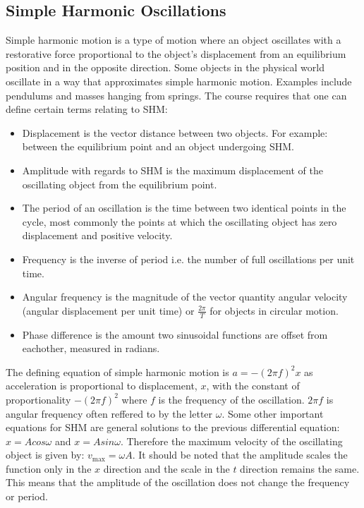 \documentclass[a4,8pt]{article}
\begin{document}
\subsection{Simple Harmonic Oscillations}
Simple harmonic motion is a type of motion where an object oscillates with a restorative force 
proportional to the object's displacement from an equilibrium position and in the opposite 
direction. Some objects in the physical world oscillate in a way that approximates simple 
harmonic motion. Examples include pendulums and masses hanging from springs. The course 
requires that one can define certain terms relating to SHM:
\begin{itemize}
	\item Displacement is the vector distance between two objects. For example: between the 
    equilibrium point and an object undergoing SHM.
	\item Amplitude with regards to SHM is the maximum displacement of the oscillating object 
    from the equilibrium point.
	\item The period of an oscillation is the time between two identical points in the cycle, 
    most commonly the points at which the oscillating object has zero displacement and positive
    velocity.
	\item Frequency is the inverse of period i.e. the number of full oscillations per unit 
    time.
	\item Angular frequency is the magnitude of the vector quantity angular velocity (angular 
    displacement per unit time) or $\frac{2\pi}{T}$ for objects in circular motion.
	\item Phase difference is the amount two sinusoidal functions are offset from eachother, 
    measured in radians.
\end{itemize}

The defining equation of simple harmonic motion is $a=-(2\pi f)^2 x$ as acceleration is 
proportional to displacement, $x$, with the constant of proportionality $-(2\pi f)^2$ where $f$
is the frequency of the oscillation. $2\pi f$ is angular frequency often reffered to by the 
letter $\omega$. Some other important equations for SHM are general solutions to the previous 
differential equation: $x=Acos\omega$ and $x=Asin\omega$. Therefore the maximum velocity of the
oscillating object is given by: $v_\text{max}=\omega A$. It should be noted that the amplitude 
scales the function only in the $x$ direction and the scale in the $t$ direction remains the 
same. This means that the amplitude of the oscillation does not change the frequency or period.
\vspace{8pt}
\end{document}
